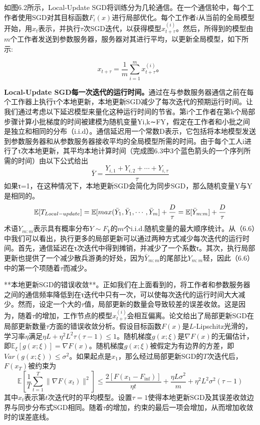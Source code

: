 如图6.2所示，Local-Update SGD将训练分为几轮通信。在一个通信轮中，每个工作者使用SGD对其目标函数$F_{i}(x)$进行局部优化。每个工作者$i$从当前的全局模型开始，用$x_{t}$表示，并执行$\tau$次SGD迭代，以获得模型$x_{t+\tau}^{(i)}$。然后，所得到的模型由$m$个工作者发送到参数服务器，服务器对其进行平均，以更新全局模型，如下所示:

$$
x_{t+\tau} = \frac{1}{m}\sum_{i=1}^{m}x_{t+\tau}^{(i)}。
$$

\textbf{Local-Update SGD每一次迭代的运行时间。}通过在与参数服务器通信之前在每个工作器上执行τ个本地更新，本地更新SGD减少了每次迭代的预期运行时间。让我们通过考虑以下延迟模型来量化这种运行时间的节省。第i个工作者在第k个局部步骤计算小批梯度的时间被建模为随机变量Yi,k∼FY，假定在工作者和小批之间是独立和相同的分布（i.i.d）。通信延迟用一个常数D表示，它包括将本地模型发送到参数服务器和从参数服务器接收平均的全局模型所需的时间。由于每个工人i进行了τ次本地更新，其平均本地计算时间（完成图6.3中3个蓝色箭头的一个序列所需的时间）由以下公式给出
$$\bar{Y} = \frac{Y_{i, 1} + Y_{i, 2} + \cdots + Y_{i, \tau}}{\tau}$$
如果τ=1，在这种情况下，本地更新SGD会简化为同步SGD，那么随机变量Y与Y是相同的。
$$
\mathbb{E}[T_{Local-update}] = \mathbb{E}[max(\bar{Y}_{1}, \bar{Y}_{1}, \cdots, \bar{Y}_{m}] + \frac{D}{\tau} \\
= \mathbb{E}[\bar{Y}_{m:m}] + \frac{D}{\tau}
$$
术语$Y_{m:m}$表示具有概率分布$Y \sim F_{Y}$的$m$个i.i.d.随机变量的最大顺序统计。从（6.6）中我们可以看出，执行更多的局部更新可以通过两种方式减少每次迭代的运行时间。首先，通信延迟在τ次迭代中得到摊销，并减少了一个系数τ。其次，执行局部更新也提供了一个减少散兵游勇的好处，因为$\bar{Y}_{m:m}$的尾部比$Y_{m:m}$轻，因此（6.6）中的第一个项随着$\tau$而减少。

**本地更新SGD的错误收敛**。正如我们在上面看到的，将工作者和参数服务器之间的通信频率降低到在τ迭代中只有一次，可以使每次迭代的运行时间大大减少。然而，设定一个大的$\tau$值，局部更新的数量会导致较差的误差收敛。这是因为，随着$\tau$的增加，工作节点的模型$x^{(i)}_{t+\tau}$会相互偏离。论文给出了局部更新SGD在局部更新数量$\tau$方面的错误收敛分析。假设目标函数$F(x)$是$L$-Lipschitz光滑的，学习率$\eta$满足$\eta L + \eta^{2}L^{2}\tau(\tau - 1) ≤ 1$。随机梯度$g(x; \xi)$是$\nabla F(x)$的无偏估计，即$\mathbb{E}_{\xi}[g(x; \xi)] = \nabla F(x)$。随机梯度$g(x; \xi)$被假定为有边界的方差，即$Var(g(x; \xi))≤\sigma^{2}$。如果起点是$x_{1}$，那么经过局部更新SGD的$T$次迭代后，$F(x_{T})$被约束为
$$
\mathbb{E}[\frac{1}{T}\sum_{t=1}^{T}\|\nabla F(x_{t})\|^{2}] \leq \frac{2[F(x_{1}-F_{\inf})]}{\eta t} + \frac{\eta L \sigma^{2}}{m} + \eta^{2}L^{2}\sigma^{2}(\tau - 1)
$$
其中$x_{t}$表示第$t$次迭代时的平均模型。设置$\tau=1$使得本地更新SGD及其误差收敛边界与同步分布式SGD相同。随着$\tau$的增加，约束的最后一项会增加，从而增加收敛时的误差底线。

